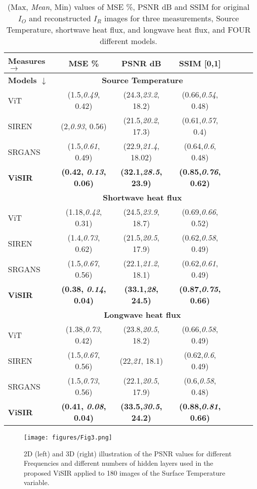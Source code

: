 \documentclass[pdflatex,sn-mathphys-num]{sn-jnl}%
\begin{document}
\begin{table}[!ht]
\centering
\caption{(Max, {\em Mean}, Min) values of MSE \%, PSNR dB and SSIM for original $I_O$ and reconstructed $I_R$ images for three measurements, Source Temperature, shortwave heat flux, and longwave heat flux, and FOUR different models.}
\begin{tabular}{lcccccc}
\textbf{Measures $\rightarrow$} & \textbf{ MSE \%} & \textbf{PSNR dB} & \textbf{SSIM [0,1]}\\ 
\toprule
\textbf{Models $\downarrow$} & \multicolumn{3}{c}{\bf Source Temperature}\\
\midrule
ViT &(1.5,{\em 0.49}, 0.42)&(24.3,{\em 23.2}, 18.2)&(0.66,{\em 0.54}, 0.48)\\
SIREN &(2,{\em 0.93}, 0.56)&(21.5,{\em 20.2}, 17.3)&(0.61,{\em 0.57}, 0.4) \\
SRGANS &(1.5,{\em 0.61}, 0.49)&(22.9,{\em 21.4}, 18.02)&(0.64,{\em 0.6}, 0.48) \\
\textbf{ViSIR} &\textbf{(0.42, {\em 0.13}, 0.06)}&\textbf{(32.1,{\em 28.5}, 23.9)}&\textbf{(0.85,{\em 0.76}, 0.62)} \\
\toprule
\textbf{} & \multicolumn{3}{c}{\bf Shortwave heat flux}\\ \midrule
ViT &(1.18,{\em 0.42}, 0.31)&(24.5,{\em 23.9}, 18.7)&(0.69,{\em 0.66}, 0.52)\\
SIREN &(1.4,{\em 0.73}, 0.62)&(21.5,{\em 20.5}, 17.9)&(0.62,{\em 0.58}, 0.49) \\
SRGANS &(1.5,{\em 0.67}, 0.56)&(22.1,{\em 21.2}, 18.1)&(0.62,{\em 0.61}, 0.49) \\
\textbf{ViSIR} &\textbf{(0.38, {\em 0.14}, 0.04)}&\textbf{(33.1,{\em 28}, 24.5)}&\textbf{(0.87,{\em 0.75}, 0.66)} \\
\toprule
\textbf{} & \multicolumn{3}{c}{\bf Longwave heat flux}\\
\midrule
ViT &(1.38,{\em 0.73}, 0.42)&(23.8,{\em 20.5}, 18.2)&(0.66,{\em 0.58}, 0.49)\\
SIREN &(1.5,{\em 0.67}, 0.56)&(22,{\em 21}, 18.1)&(0.62,{\em 0.6}, 0.49) \\
SRGANS &(1.5,{\em 0.73}, 0.56)&(22.1,{\em 20.5}, 17.9)&(0.6,{\em 0.58}, 0.48) \\
\textbf{ViSIR} &\textbf{(0.41, {\em 0.08}, 0.04)}&\textbf{(33.5,{\em 30.5}, 24.2)}&\textbf{(0.88,{\em 0.81}, 0.66)} \\
\bottomrule
\end{tabular}\label{tab-Compare}
\end{table} 

\begin{figure}[!ht] 
 \centering
 \texttt{[image: figures/Fig3.png]} 
 \caption{2D (left) and 3D (right) illustration of the PSNR values for different Frequencies and different numbers of hidden layers used in the proposed ViSIR applied to 180 images of the Surface Temperature variable. }
 \label{fig-FreqVsLayer} 
\end{figure} 
\end{document}
